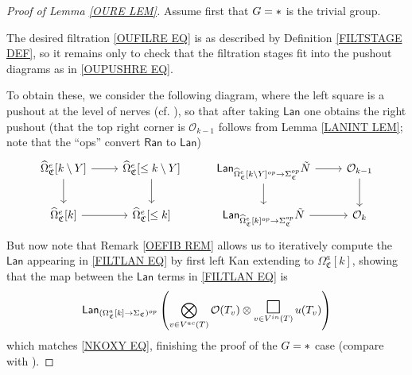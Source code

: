 \documentclass[a4paper,10pt
,draft
]{article}%
\numberwithin{equation}{section}
\numberwithin{figure}{section}
\theoremstyle{definition} %
\renewcommand{\O}{\ensuremath{\mathcal O}}
\newcommand{\1}{\ensuremath{\mathbbm 1}}%
\newcommand{\SC}{\Sigma_{\mathfrak C}}
\newcommand{\OC}{\Omega_{\mathfrak C}}
\begin{document}
\begin{proof}[Proof of Lemma \ref{OURE LEM}]
	Assume first that $G = \**$ is the trivial group.
	
	The desired filtration \eqref{OUFILRE EQ} is as described by Definition \ref{FILTSTAGE DEF},
	so it remains only to check that the filtration stages
	fit into the pushout diagrams as in \eqref{OUPUSHRE EQ}.
	
	To obtain these, we consider the following diagram,
	where the left square is a pushout at the level of nerves (cf. \cite[(5.75)]{BP_geo}),
	so that after taking $\mathsf{Lan}$ 
	one obtains the right pushout
	(that the top right corner is $\O_{k-1}$ follows from Lemma \ref{LANINT LEM}; note that the ``ops''
	convert $\mathsf{Ran}$ to $\mathsf{Lan}$)
	\begin{equation}\label{FILTLAN EQ}
	\begin{tikzcd}
	\widehat\Omega_{\mathfrak C}^e[k \setminus Y] \arrow[r] \arrow[d]
	&
	\widehat\Omega_{\mathfrak C}^e[\leq k \setminus Y] \arrow[d]
	&
	\mathsf{Lan}_{\widehat\Omega_{\mathfrak C}^e[k \setminus Y]^{op} \to \SC^{op}} \tilde N \arrow[r] \arrow[d]
	&
	\O_{k-1} \arrow[d]
	\\
	\widehat\Omega_{\mathfrak C}^e[k] \arrow[r]
	&
	\widehat\Omega_{\mathfrak C}^e[\leq k]
	&
	\mathsf{Lan}_{\widehat \Omega_{\mathfrak C}^e[k]^{op} \to \SC^{op}} \tilde N \arrow[r]
	&
	\O_k
	\end{tikzcd}
	\end{equation}
	But now note that Remark \ref{OEFIB REM}
	allows us to iteratively compute the
	$\mathsf{Lan}$
	appearing in \eqref{FILTLAN EQ}
	by first left Kan extending to 
	$\Omega^a_{\mathfrak{C}}[k]$,
	showing that the map between the $\mathsf{Lan}$ terms 
	in \eqref{FILTLAN EQ} is
	\begin{equation}\label{FILTLANFIN EQ}
	\mathsf{Lan}_{(\OC^a[k] \to \SC)^{op}}\left(
	\bigotimes_{v \in V^{ac}(T)}\O(T_v) \otimes
	\mathop{\mathlarger{\mathlarger{\mathlarger{\square}}}}\limits_{v \in V^{in}(T)} u(T_v)
	\right)
	\end{equation}
	which matches \eqref{NKOXY EQ}, finishing the proof of the 
	$G = \**$ case
	(compare with \cite[Prop. 5.77]{BP_geo}).
	

\end{proof}
\end{document}
